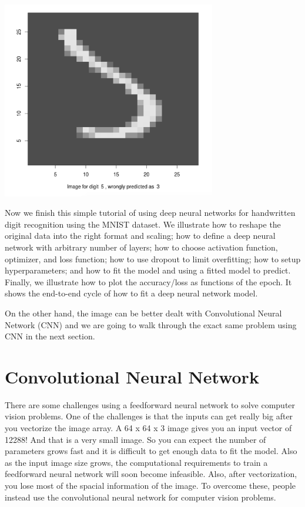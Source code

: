 \documentclass[12pt,]{krantz}
\begin{document}
\includegraphics[width=0.7\textwidth,height=\textheight]{images/misclassified_img.png}

Now we finish this simple tutorial of using deep neural networks for handwritten digit recognition using the MNIST dataset. We illustrate how to reshape the original data into the right format and scaling; how to define a deep neural network with arbitrary number of layers; how to choose activation function, optimizer, and loss function; how to use dropout to limit overfitting; how to setup hyperparameters; and how to fit the model and using a fitted model to predict. Finally, we illustrate how to plot the accuracy/loss as functions of the epoch. It shows the end-to-end cycle of how to fit a deep neural network model.

On the other hand, the image can be better dealt with Convolutional Neural Network (CNN) and we are going to walk through the exact same problem using CNN in the next section.

\hypertarget{convolutional-neural-network}{%
\section{Convolutional Neural Network}\label{convolutional-neural-network}}

There are some challenges using a feedforward neural network to solve computer vision problems. One of the challenges is that the inputs can get really big after you vectorize the image array. A 64 x 64 x 3 image gives you an input vector of 12288! And that is a very small image. So you can expect the number of parameters grows fast and it is difficult to get enough data to fit the model. Also as the input image size grows, the computational requirements to train a feedforward neural network will soon become infeasible. Also, after vectorization, you lose most of the spacial information of the image. To overcome these, people instead use the convolutional neural network for computer vision problems.
\end{document}
